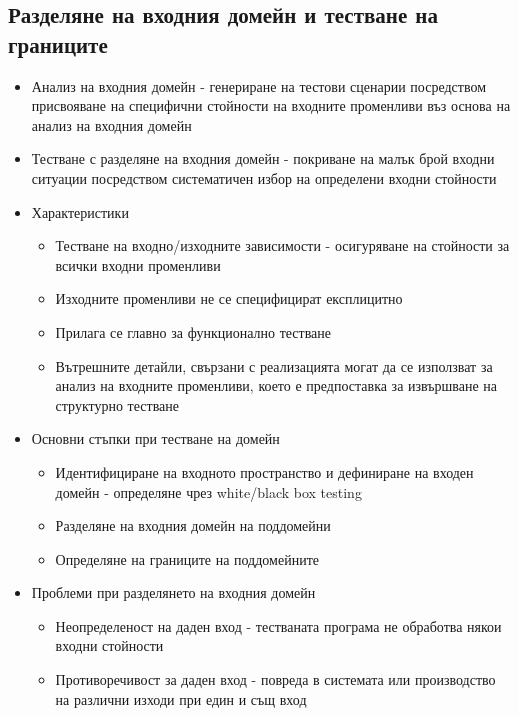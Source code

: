 \documentclass[fleqn,12pt]{article}
\begin{document}
\begin{flushleft}
    \subsection{Разделяне на входния домейн и тестване на границите}
        \begin{itemize}
            \item Анализ на входния домейн - генериране на тестови сценарии посредством присвояване на специфични стойности на входните променливи въз основа на анализ на входния домейн
            \item Тестване с разделяне на входния домейн - покриване на малък брой входни ситуации посредством систематичен избор на определени входни стойности
            \item Характеристики
                \begin{itemize}
                    \item Тестване на входно/изходните зависимости - осигуряване на стойности за всички входни променливи
                    \item Изходните променливи не се специфицират експлицитно
                    \item Прилага се главно за функционално тестване
                    \item Вътрешните детайли, свързани с реализацията могат да се използват за анализ на входните променливи, което е предпоставка за извършване на структурно тестване
                \end{itemize}
            \item Основни стъпки при тестване на домейн
                \begin{itemize}
                    \item Идентифициране на входното пространство и дефиниране на входен домейн - определяне чрез white/black box testing
                    \item Разделяне на входния домейн на поддомейни
                    \item Определяне на границите на поддомейните
                \end{itemize}
            \item Проблеми при разделянето на входния домейн
                \begin{itemize}
                    \item Неопределеност на даден вход - тестваната програма не обработва някои входни стойности
                    \item Противоречивост за даден вход - повреда в системата или производство на различни изходи при един и същ вход

\end{itemize}
\end{itemize}
\end{flushleft}
\end{document}
